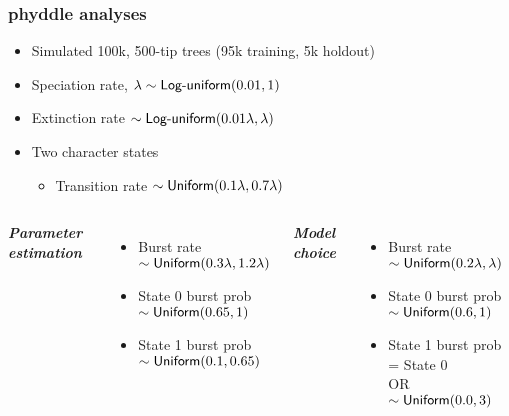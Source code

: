 \begin{frame}
    \frametitle{phyddle analyses}


    \begin{itemize}
        \setlength{\itemindent}{6em}
        \item Simulated 100k, 500-tip trees (95k training, 5k holdout)
        \item Speciation rate, $\lambda \sim \textrm{\sffamily Log-uniform}(0.01, 1)$
        \item Extinction rate $ \sim \textrm{\sffamily Log-uniform}(0.01\lambda, \lambda)$
        \item Two character states
        \begin{itemize}
            \setlength{\itemindent}{6em}
            \item Transition rate $ \sim \textrm{\sffamily Uniform}(0.1\lambda, 0.7\lambda)$
        \end{itemize}
    \end{itemize}

    \begin{columns}[T]
        \begin{center}
            \textbf{\textit{Parameter estimation}}
        \end{center}
        \begin{itemize}
            \item Burst rate $ \sim \textrm{\sffamily Uniform}(0.3\lambda, 1.2\lambda)$
            \item State 0 burst prob $ \sim \textrm{\sffamily Uniform}(0.65, 1)$
            \item State 1 burst prob $ \sim \textrm{\sffamily Uniform}(0.1, 0.65)$
        \end{itemize}

        \begin{center}
            \textbf{\textit{Model choice}}
        \end{center}
        \begin{itemize}
            \item Burst rate $ \sim \textrm{\sffamily Uniform}(0.2\lambda, \lambda)$
            \item State 0 burst prob $ \sim \textrm{\sffamily Uniform}(0.6, 1)$
            \item State 1 burst prob = State 0 \\ OR $ \sim \textrm{\sffamily Uniform}(0.0, 3)$
        \end{itemize}
    \end{columns}
\end{frame}
